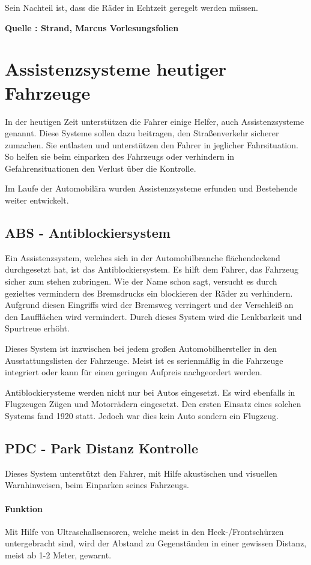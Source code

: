Sein Nachteil ist, dass die Räder in Echtzeit geregelt werden müssen.  

\textbf{Quelle : Strand, Marcus Vorlesungsfolien } 

\section{Assistenzsysteme heutiger Fahrzeuge}
In der heutigen Zeit unterstützen die Fahrer einige Helfer, auch Assistenzsysteme genannt. Diese Systeme sollen dazu beitragen, den Straßenverkehr sicherer zumachen. Sie entlasten und unterstützen den Fahrer in jeglicher Fahrsituation. So helfen sie beim einparken des Fahrzeugs oder verhindern in Gefahrensituationen den Verlust über die Kontrolle.

Im Laufe der Automobilära wurden Assistenzsysteme erfunden und Bestehende weiter entwickelt. 
\subsection{ABS - Antiblockiersystem}
Ein Assistenzsystem, welches sich in der Automobilbranche flächendeckend durchgesetzt hat, ist das Antiblockiersystem. Es hilft dem Fahrer, das Fahrzeug sicher zum stehen zubringen. Wie der Name schon sagt, versucht es durch gezieltes vermindern des Bremsdrucks ein blockieren der Räder zu verhindern. Aufgrund diesen Eingriffs wird der Bremsweg verringert und der Verschleiß an den Laufflächen wird vermindert. Durch dieses System wird die Lenkbarkeit und Spurtreue erhöht.

Dieses System ist inzwischen bei jedem großen Automobilhersteller in den Ausstattungslisten der Fahrzeuge. Meist ist es serienmäßig in die Fahrzeuge integriert oder kann für einen geringen Aufpreis nachgeordert werden. 

Antiblockierysteme werden nicht nur bei Autos eingesetzt. Es wird ebenfalls in Flugzeugen Zügen und Motorrädern eingesetzt. 
Den ersten Einsatz eines solchen Systems fand 1920 statt. Jedoch war dies kein Auto sondern ein Flugzeug.

\subsection{PDC - Park Distanz Kontrolle}
Dieses System unterstützt den Fahrer, mit Hilfe akustischen und visuellen Warnhinweisen, beim Einparken seines Fahrzeugs. 
\paragraph{Funktion}Mit Hilfe von Ultraschallsensoren, welche meist in den Heck-/Frontschürzen untergebracht sind, wird der Abstand zu Gegenständen in einer gewissen Distanz, meist ab 1-2 Meter, gewarnt. 

